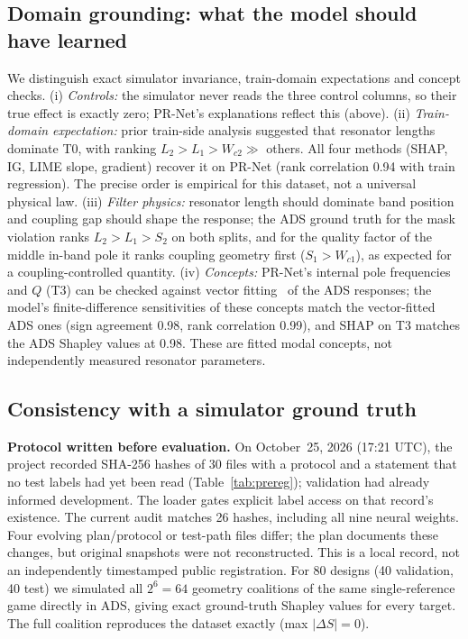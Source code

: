 \documentclass[conference,10pt]{IEEEtran}
\begin{document}
\subsection{Domain grounding: what the model should have learned}
\label{sec:ground}
We distinguish exact simulator invariance, train-domain expectations and concept checks.
(i) \emph{Controls:} the simulator never reads the three control columns, so their true effect is exactly zero; PR-Net's explanations reflect this (above).
(ii) \emph{Train-domain expectation:} prior train-side analysis suggested that resonator lengths dominate T0, with ranking $L_2>L_1>W_{c2}\gg$ others. All four methods (SHAP, IG, LIME slope, gradient) recover it on PR-Net (rank correlation 0.94 with train regression). The precise order is empirical for this dataset, not a universal physical law.
(iii) \emph{Filter physics:} resonator length should dominate band position and coupling gap should shape the response; the ADS ground truth for the mask violation ranks $L_2>L_1>S_2$ on both splits, and for the quality factor of the middle in-band pole it ranks coupling geometry first ($S_1>W_{c1}$), as expected for a coupling-controlled quantity.
(iv) \emph{Concepts:} PR-Net's internal pole frequencies and $Q$ (T3) can be checked against vector fitting~\cite{gustavsen1999} of the ADS responses; the model's finite-difference sensitivities of these concepts match the vector-fitted ADS ones (sign agreement 0.98, rank correlation 0.99), and SHAP on T3 matches the ADS Shapley values at 0.98. These are fitted modal concepts, not independently measured resonator parameters.

\subsection{Consistency with a simulator ground truth}
\label{sec:truth}
\textbf{Protocol written before evaluation.} On October~25, 2026 (17:21 UTC), the project recorded SHA-256 hashes of 30 files with a protocol and a statement that no test labels had yet been read (Table~\ref{tab:prereg}); validation had already informed development. The loader gates explicit label access on that record's existence. The current audit matches 26 hashes, including all nine neural weights. Four evolving plan/protocol or test-path files differ; the plan documents these changes, but original snapshots were not reconstructed. This is a local record, not an independently timestamped public registration.
For 80 designs (40 validation, 40 test) we simulated all $2^6=64$ geometry coalitions of the same single-reference game directly in ADS, giving exact ground-truth Shapley values for every target.
The full coalition reproduces the dataset exactly (max $|\Delta S|=0$).
\end{document}
